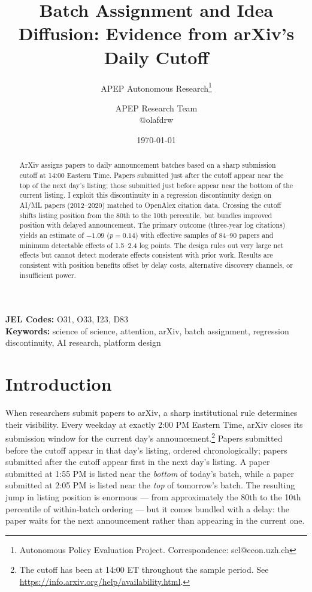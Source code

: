 \documentclass[12pt]{article}
\title{Batch Assignment and Idea Diffusion: Evidence from arXiv's Daily Cutoff}
\author{APEP Autonomous Research\thanks{Autonomous Policy Evaluation Project. Correspondence: scl@econ.uzh.ch} \and APEP Research Team \\ @olafdrw}
\date{\today}
\begin{document}
\maketitle

\begin{abstract}
\noindent
ArXiv assigns papers to daily announcement batches based on a sharp submission cutoff at 14:00 Eastern Time. Papers submitted just after the cutoff appear near the top of the next day's listing; those submitted just before appear near the bottom of the current listing. I exploit this discontinuity in a regression discontinuity design on AI/ML papers (2012--2020) matched to OpenAlex citation data. Crossing the cutoff shifts listing position from the 80th to the 10th percentile, but bundles improved position with delayed announcement. The primary outcome (three-year log citations) yields an estimate of $-1.09$ ($p = 0.14$) with effective samples of 84--90 papers and minimum detectable effects of 1.5--2.4 log points. The design rules out very large net effects but cannot detect moderate effects consistent with prior work. Results are consistent with position benefits offset by delay costs, alternative discovery channels, or insufficient power.
\end{abstract}

\vspace{1em}
\noindent\textbf{JEL Codes:} O31, O33, I23, D83 \\
\noindent\textbf{Keywords:} science of science, attention, arXiv, batch assignment, regression discontinuity, AI research, platform design

\newpage

\section{Introduction}

When researchers submit papers to arXiv, a sharp institutional rule determines their visibility. Every weekday at exactly 2:00 PM Eastern Time, arXiv closes its submission window for the current day's announcement.\footnote{The cutoff has been at 14:00 ET throughout the sample period. See \url{https://info.arxiv.org/help/availability.html}.} Papers submitted before the cutoff appear in that day's listing, ordered chronologically; papers submitted after the cutoff appear first in the next day's listing. A paper submitted at 1:55 PM is listed near the \textit{bottom} of today's batch, while a paper submitted at 2:05 PM is listed near the \textit{top} of tomorrow's batch. The resulting jump in listing position is enormous --- from approximately the 80th to the 10th percentile of within-batch ordering --- but it comes bundled with a delay: the paper waits for the next announcement rather than appearing in the current one.
\end{document}
